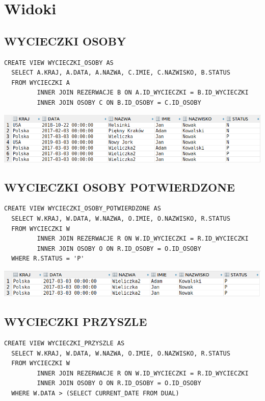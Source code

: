 \newpage
\section{Widoki}

\subsection{WYCIECZKI OSOBY}
\begin{verbatim}
CREATE VIEW WYCIECZKI_OSOBY AS
  SELECT A.KRAJ, A.DATA, A.NAZWA, C.IMIE, C.NAZWISKO, B.STATUS
  FROM WYCIECZKI A
         INNER JOIN REZERWACJE B ON A.ID_WYCIECZKI = B.ID_WYCIECZKI
         INNER JOIN OSOBY C ON B.ID_OSOBY = C.ID_OSOBY
\end{verbatim}

\includegraphics[width=\linewidth]{./images/wycieczki_osoby.png}

\subsection{WYCIECZKI OSOBY POTWIERDZONE}
\begin{verbatim}
CREATE VIEW WYCIECZKI_OSOBY_POTWIERDZONE AS
  SELECT W.KRAJ, W.DATA, W.NAZWA, O.IMIE, O.NAZWISKO, R.STATUS
  FROM WYCIECZKI W 
         INNER JOIN REZERWACJE R ON W.ID_WYCIECZKI = R.ID_WYCIECZKI
         INNER JOIN OSOBY O ON R.ID_OSOBY = O.ID_OSOBY
  WHERE R.STATUS = 'P'
\end{verbatim}

\includegraphics[width=\linewidth]{./images/wycieczki_osoby_potwierdzone.png}

\subsection{WYCIECZKI PRZYSZLE}
\begin{verbatim}
CREATE VIEW WYCIECZKI_PRZYSZLE AS
  SELECT W.KRAJ, W.DATA, W.NAZWA, O.IMIE, O.NAZWISKO, R.STATUS
  FROM WYCIECZKI W
         INNER JOIN REZERWACJE R ON W.ID_WYCIECZKI = R.ID_WYCIECZKI
         INNER JOIN OSOBY O ON R.ID_OSOBY = O.ID_OSOBY
  WHERE W.DATA > (SELECT CURRENT_DATE FROM DUAL)
\end{verbatim}

